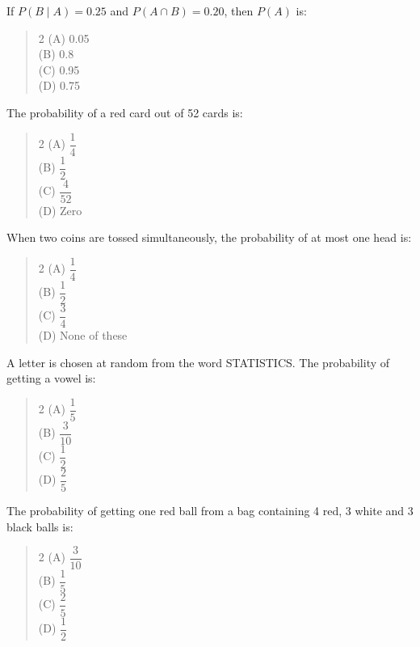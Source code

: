 \documentclass[11pt,a4paper]{article}
\begin{document}
\begin{mcqlist}
\item If $P(B\mid A)=0.25$ and $P(A\cap B)=0.20$, then $P(A)$ is:
\begin{quote}\begin{multicols}{2}
\noindent (A) 0.05 \\
(B) 0.8 \\
(C) 0.95 \\
(D) 0.75
\end{multicols}\end{quote}

\item The probability of a red card out of 52 cards is:
\begin{quote}\begin{multicols}{2}
\noindent (A) $\dfrac{1}{4}$ \\
(B) $\dfrac{1}{2}$ \\
(C) $\dfrac{4}{52}$ \\
(D) Zero
\end{multicols}\end{quote}

\item When two coins are tossed simultaneously, the probability of at most one head is:
\begin{quote}\begin{multicols}{2}
\noindent (A) $\dfrac{1}{4}$ \\
(B) $\dfrac{1}{2}$ \\
(C) $\dfrac{3}{4}$ \\
(D) None of these
\end{multicols}\end{quote}

\item A letter is chosen at random from the word STATISTICS. The probability of getting a vowel is:
\begin{quote}\begin{multicols}{2}
\noindent (A) $\dfrac{1}{5}$ \\
(B) $\dfrac{3}{10}$ \\
(C) $\dfrac{1}{2}$ \\
(D) $\dfrac{2}{5}$
\end{multicols}\end{quote}

\item The probability of getting one red ball from a bag containing 4 red, 3 white and 3 black balls is:
\begin{quote}\begin{multicols}{2}
\noindent (A) $\dfrac{3}{10}$ \\
(B) $\dfrac{1}{5}$ \\
(C) $\dfrac{2}{5}$ \\
(D) $\dfrac{1}{2}$
\end{multicols}\end{quote}


\end{mcqlist}
\end{document}
